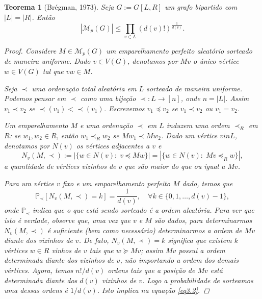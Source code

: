 \documentclass{amsart}
\theoremstyle{theorem}
\newtheorem{teorema}{Teorema}[section]
\theoremstyle{definition}
\theoremstyle{remark}
\numberwithin{equation}{section}
\begin{document}
\begin{teorema}[Br\'{e}gman, 1973]
  Seja $G:=G[L,R]$ um grafo bipartido com $|L| = |R|$. Ent\~{a}o
  \begin{equation}
    |\mathcal{M}_{p}(G)| \leq \prod_{v \in L} (d(v)!)^{\frac{1}{d(v)}}.
  \end{equation}

  \begin{proof}
    Considere $M \in \mathcal{M}_p (G)$ um emparelhamento perfeito aleat\'{o}rio sorteado de maneira uniforme. Dado $v\in V(G)$, denotamos por $Mv$ o \'{u}nico v\'{e}rtice $w\in V(G)$ tal que $vw\in M$.

    Seja $\prec$ uma ordena\c{c}\~{a}o total aleat\'{o}ria em $L$ sorteado de maneira uniforme. Podemos pensar em $\prec$ como uma bije\c{c}\~{a}o $\prec:L\rightarrow [n]$, onde $n = |L|$. Assim $v_1 \prec v_2$ se $\prec(v_1) < \prec(v_1)$. Escrevemos $v_1 \preceq v_2$ se $v_1\prec v_2$ ou $v_1 = v_2$.

    Um emparelhamento $M$ e uma ordena\c{c}\~{a}o $\prec$ em $L$ induzem uma ordem $\prec_R$ em $R$: se $w_1,w_2\in R$, ent\~{a}o $w_1 \prec_R w_2$ se $M w_1 \prec M w_2$. Dado um v\'{e}rtice $v in L$, denotamos por $N(v)$ os v\'{e}rtices adjacentes a $v$ e
    \begin{equation*}
      N_{v}(M,\prec):= |\{w\in N(v):\; v \preceq Mw \}| = |\{w\in N(v):\; Mv \preceq_R w \}|,
    \end{equation*}
    a quantidade de v\'{e}rtices vizinhos de $v$ que s\~{a}o maior do que ou igual a $Mv$.

    Para um v\'{e}rtice $v$ fixo e um emparelhamento perfeito $M$ dado, temos que
    \begin{equation}\label{eq3.2}
      \mathbb{P}_{\prec}[N_v(M,\prec)=k] = \frac{1}{d(v)}, \quad \forall k \in \{0,1,\ldots,d(v)-1\},
    \end{equation}
    onde $\mathbb{P}_{\prec}$ indica que o que est\'{a} sendo sorteado \'{e} a ordem aleat\'{o}ria. Para ver que isto \'{e} verdade, observe que, uma vez que $v$ e $M$ s\~{a}o dados, para determinarmos $N_v(M,\prec)$ \'{e} suficiente (bem como necess\'{a}rio) determinarmos a ordem de $Mv$ diante dos vizinhos de $v$. De fato, $N_v(M,\prec) = k$ significa que existem $k$ v\'{e}rtices $w\in R$ vinhos de $v$ tais que $w\succeq Mv$; assim $Mv$ possui a ordem determinada diante dos vizinhos de $v$, n\~{a}o importando a ordem dos demais v\'{e}rtices. Agora, temos $n!/d(v)$ ordens tais que a posi\c{c}\~{a}o de $Mv$ est\'{a} determinada diante dos $d(v)$ vizinhos de $v$. Logo a probabilidade de sorteamos uma dessas ordens \'{e} $1/d(v)$. Isto implica na equa\c{c}\~{a}o \ref{eq3.2}.


\end{proof}
\end{teorema}
\end{document}
